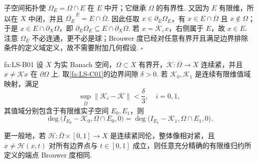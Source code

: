 \begin{FAProof}
子空间拓扑使 \(\displaystyle\Omega_E=\Omega\cap E\) 在 \(\displaystyle E\) 中开；它继承 \(\displaystyle\Omega\) 的有界性. 又因为 \(\displaystyle E\) 有限维，所以在 \(\displaystyle X\) 中闭，并且
\(\displaystyle \overline{\Omega_E}^{\,E} = E\cap\overline\Omega.\)
因此任取 \(\displaystyle x\in\partial_E\Omega_E\)，有 \(\displaystyle x\in E\cap\overline\Omega\) 且 \(\displaystyle x\notin\Omega\)；于是 \(\displaystyle x\in E\cap\partial_X\Omega\)，即 \(\displaystyle\partial_E\Omega_E\subseteq E\cap\partial_X\Omega\). 若 \(\displaystyle x=\mathcal K_{\varepsilon}x\)，右侧属于 \(\displaystyle E\)，故 \(\displaystyle x\in E\). 注意 \(\displaystyle\Omega_E\) 不必连通，更不必是球；Brouwer 度已经对任意有界开且满足边界排除条件的定义域定义，故不需要附加几何假设. \hfill\(\square\)
\end{FAProof}

\begin{FATheorem}{fa:LS-B01}
设 \(\displaystyle X\) 为实 Banach 空间，\(\displaystyle\Omega\subset X\) 有界开，\(\displaystyle\mathcal K:\overline\Omega\to X\) 连续紧，并且 \(\displaystyle x\neq\mathcal Kx\) 在 \(\displaystyle\partial\Omega\) 上. 取\autoref{fa:LS-C01}的边界间隙 \(\displaystyle\delta>0\). 若 \(\displaystyle\mathcal K_0,\mathcal K_1\) 是连续有限维值域映射，满足
\[
\sup_{\overline\Omega}\|\mathcal K_i-\mathcal K\|<\frac{\delta}{3},
\quad i=0,1,
\]
其值域分别包含于有限维实子空间 \(\displaystyle E_0,E_1\)，则
\[
\deg\bigl(I_{E_0}-\mathcal K_0,\Omega\cap E_0,0\bigr)
=
\deg\bigl(I_{E_1}-\mathcal K_1,\Omega\cap E_1,0\bigr).
\]

更一般地，若 \(\displaystyle\mathcal H:\overline\Omega\times[0,1]\to X\) 是连续紧同伦，整体像相对紧，且 \(\displaystyle x\neq\mathcal H(x,t)\) 对所有边界点与 \(\displaystyle t\in[0,1]\) 成立，则任意充分精确的有限维归约所定义的端点 Brouwer 度相同.
\end{FATheorem}

